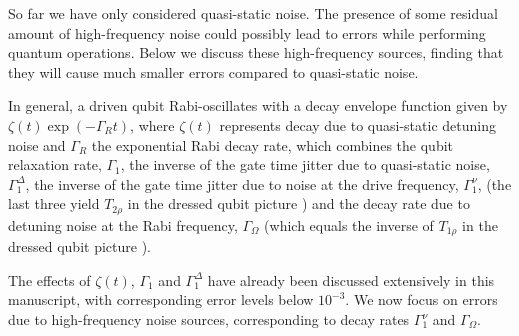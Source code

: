 So far we have only considered quasi-static noise. The presence of some residual amount of high-frequency noise could possibly lead to errors while performing quantum operations. Below we discuss these high-frequency sources, finding that they will cause much smaller errors compared to quasi-static noise.

In general, a driven qubit Rabi-oscillates with a decay envelope function given by \cite{Bylander2011S} $\zeta(t)\exp(-\Gamma_Rt)$, where $\zeta(t)$ represents decay due to quasi-static detuning noise and $\Gamma_R$ the exponential Rabi decay rate, which combines the qubit relaxation rate, $\Gamma_1$, the inverse of the gate time jitter due to quasi-static noise, $\Gamma_1^{\Delta}$, the inverse of the gate time jitter due to noise at the drive frequency, $\Gamma_1^{\nu}$, (the last three yield $T_{2\rho}$ in the dressed qubit picture \cite{Laucht2016S}) and the decay rate due to detuning noise at the Rabi frequency, $\Gamma_\Omega$ (which equals the inverse of $T_{1\rho}$ in the dressed qubit picture \cite{Yan2013S,Laucht2016S}).

The effects of $\zeta(t)$, $\Gamma_1$ and $\Gamma_1^{\Delta}$ have already been discussed extensively in this manuscript, with corresponding error levels below $10^{-3}$. We now focus on errors due to high-frequency noise sources, corresponding to decay rates $\Gamma_1^{\nu}$ and $\Gamma_\Omega$.

